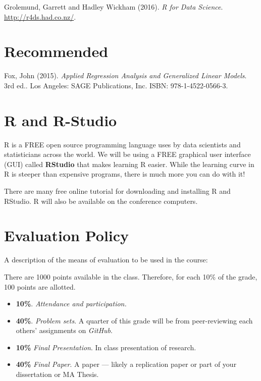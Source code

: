 \documentclass[11pt,]{article}
\begin{document}
 Grolemund, Garrett and Hadley Wickham (2016).
\emph{R for Data Science}. \url{http://r4ds.had.co.nz/}.

\section{Recommended}\label{recommended}

 Fox, John (2015).
\emph{Applied Regression Analysis and Generalized
Linear Models}. 3rd ed.. Los Angeles: SAGE Publications, Inc. ISBN:
978-1-4522-0566-3.

\section{R and R-Studio}\label{r-and-r-studio}

R is a FREE open source programming language uses by data scientists and
statisticians across the world. We will be using a FREE graphical user
interface (GUI) called \textbf{RStudio} that makes learning R easier.
While the learning curve in R is steeper than expensive programs, there
is much more you can do with it!

There are many free online tutorial for downloading and installing R and
RStudio. R will also be available on the conference computers.

\section{Evaluation Policy}\label{evaluation-policy}

A description of the means of evaluation to be used in the course:

There are 1000 points available in the class. Therefore, for each 10\%
of the grade, 100 points are allotted.

\begin{itemize}
\item
  \textbf{10\%}. \emph{Attendance and participation.}
\item
  \textbf{40\%}. \emph{Problem sets}. A quarter of this grade will be
  from peer-reviewing each others' assignments on \emph{GitHub}.
\item
  \textbf{10\%} \emph{Final Presentation}. In class presentation of
  research.
\item
  \textbf{40\%} \emph{Final Paper}. A paper --- likely a replication
  paper or part of your dissertation or MA Thesis.
\end{itemize}
\end{document}
